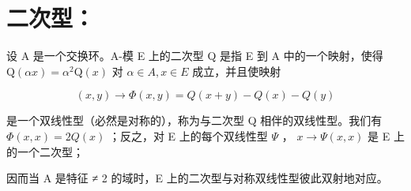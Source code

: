 \section*{二次型：}

设 A 是一个交换环。A-模 E 上的二次型 Q 是指 E 到 A 中的一个映射，使得 \(\mathrm{Q}(\alpha x) = \alpha^{2}\mathrm{Q}(x)\) 对 \(\alpha \in A, x \in E\) 成立，并且使映射

\[
(x, y) \rightarrow \Phi (x, y) = Q (x + y) - Q (x) - Q (y)
\]

是一个双线性型（必然是对称的），称为与二次型 Q 相伴的双线性型。我们有 \(\Phi(x, x) = 2Q(x)\) ；反之，对 E 上的每个双线性型 \(\Psi\) ， \(x \to \Psi(x, x)\) 是 E 上的一个二次型；

因而当 A 是特征 ≠ 2 的域时，E 上的二次型与对称双线性型彼此双射地对应。

